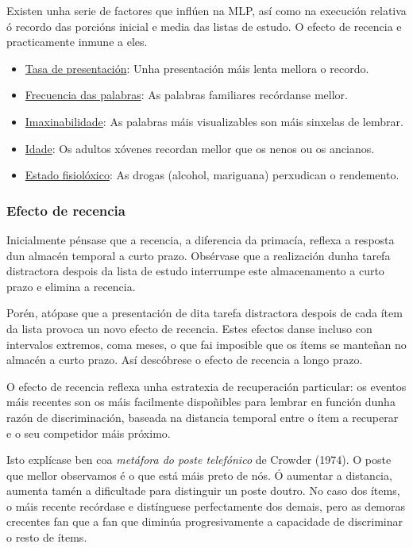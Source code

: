 \documentclass[a4paper,11pt]{article}
\begin{document}
Existen unha serie de factores que inflúen na MLP, así como na execución relativa ó recordo das porcións inicial e media das listas de estudo. O efecto de recencia e practicamente inmune a eles.
\begin{itemize}
	\item \underline{Tasa de presentación}: Unha presentación máis lenta mellora o recordo.
	\item \underline{Frecuencia das palabras}: As palabras familiares recórdanse mellor.
	\item \underline{Imaxinabilidade}: As palabras máis visualizables son máis sinxelas de lembrar.
	\item \underline{Idade}: Os adultos xóvenes recordan mellor que os nenos ou os ancianos.
	\item \underline{Estado fisiolóxico}: As drogas (alcohol, mariguana) perxudican o rendemento.
\end{itemize}

\subsubsection{Efecto de recencia}
Inicialmente pénsase que a recencia, a diferencia da primacía, reflexa a resposta dun almacén temporal a curto prazo. Obsérvase que a realización dunha tarefa distractora despois da lista de estudo interrumpe este almacenamento a curto prazo e elimina a recencia.

Porén, atópase que a presentación de dita tarefa distractora despois de cada ítem da lista provoca un novo efecto de recencia. Estes efectos danse incluso con intervalos extremos, coma meses, o que fai imposible que os ítems se manteñan no almacén a curto prazo. Así descóbrese o efecto de recencia a longo prazo. 

O efecto de recencia reflexa unha estratexia de recuperación particular: os eventos máis recentes son os máis facilmente dispoñibles para lembrar en función dunha razón de discriminación, baseada na distancia temporal entre o ítem a recuperar e o seu competidor máis próximo.

Isto explícase ben coa \textit{metáfora do poste telefónico} de Crowder (1974). O poste que mellor observamos é o que está máis preto de nós. Ó aumentar a distancia, aumenta tamén a dificultade para distinguir un poste doutro. No caso dos ítems, o máis recente recórdase e distínguese perfectamente dos demais, pero as demoras crecentes fan que a fan que diminúa progresivamente a capacidade de discriminar o resto de ítems.
\end{document}
